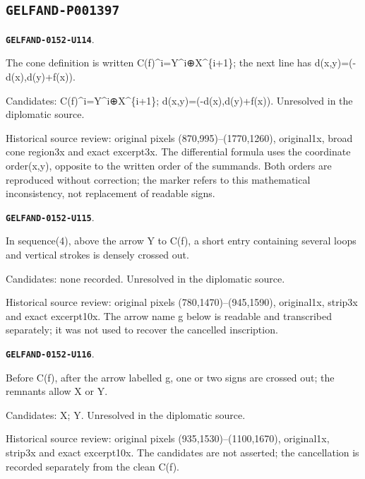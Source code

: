 \documentclass[11pt]{article}
\theoremstyle{definition}
\theoremstyle{remark}
\begin{document}
\subsection*{\texttt{GELFAND-P001397}}
\par\noindent\leavevmode{}\label{GELFAND-0152-U114}\label{GELFAND-P001397:cone-coordinate-order:note}\textbf{\texttt{GELFAND-0152-U114}}.\nopagebreak[4]\par
The cone definition is written C(f)\textasciicircum{}i=Y\textasciicircum{}i⊕X\textasciicircum{}\{i+1\}; the next line has d(x,y)=(-d(x),d(y)+f(x)).\par
Candidates: C(f)\textasciicircum{}i=Y\textasciicircum{}i⊕X\textasciicircum{}\{i+1\}; d(x,y)=(-d(x),d(y)+f(x)). Unresolved in the diplomatic source.\par
Historical source review: original pixels (870,995)–(1770,1260), original1x, broad cone region3x and exact excerpt3x. The differential formula uses the coordinate order(x,y), opposite to the written order of the summands. Both orders are reproduced without correction; the marker refers to this mathematical inconsistency, not replacement of readable signs.\par\medskip
\par\noindent\leavevmode{}\label{GELFAND-0152-U115}\label{GELFAND-P001397:sequence-arrow-cancellation:note}\textbf{\texttt{GELFAND-0152-U115}}.\nopagebreak[4]\par
In sequence(4), above the arrow Y to C(f), a short entry containing several loops and vertical strokes is densely crossed out.\par
Candidates: none recorded. Unresolved in the diplomatic source.\par
Historical source review: original pixels (780,1470)–(945,1590), original1x, strip3x and exact excerpt10x. The arrow name g below is readable and transcribed separately; it was not used to recover the cancelled inscription.\par\medskip
\par\noindent\leavevmode{}\label{GELFAND-0152-U116}\label{GELFAND-P001397:sequence-object-cancellation:note}\textbf{\texttt{GELFAND-0152-U116}}.\nopagebreak[4]\par
Before C(f), after the arrow labelled g, one or two signs are crossed out; the remnants allow X or Y.\par
Candidates: X; Y. Unresolved in the diplomatic source.\par
Historical source review: original pixels (935,1530)–(1100,1670), original1x, strip3x and exact excerpt10x. The candidates are not asserted; the cancellation is recorded separately from the clean C(f).\par\medskip
\end{document}
